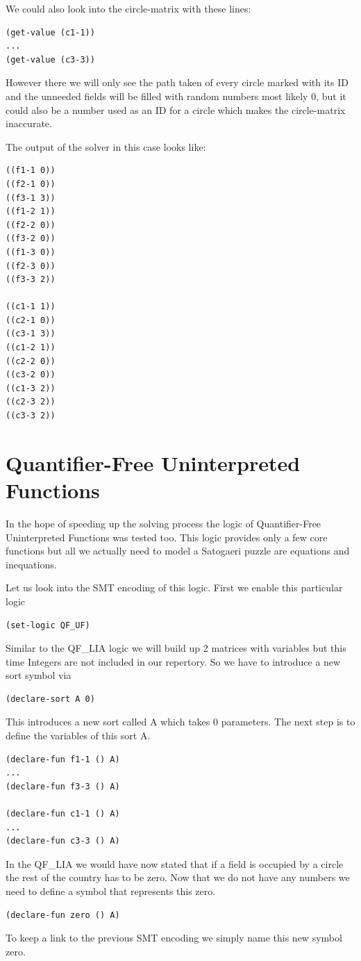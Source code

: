 We could also look into the circle-matrix with these lines:
\begin{lstlisting}
(get-value (c1-1))
...
(get-value (c3-3))
\end{lstlisting}
However there we will only see the path taken of every circle marked with its ID and the unneeded fields will be filled with random numbers most likely 0, but it could also be a number used as an ID for a circle which makes the circle-matrix inaccurate.

The output of the solver in this case looks like:
\begin{lstlisting}
((f1-1 0))
((f2-1 0))
((f3-1 3))
((f1-2 1))
((f2-2 0))
((f3-2 0))
((f1-3 0))
((f2-3 0))
((f3-3 2))

((c1-1 1))
((c2-1 0))
((c3-1 3))
((c1-2 1))
((c2-2 0))
((c3-2 0))
((c1-3 2))
((c2-3 2))
((c3-3 2))
\end{lstlisting}

\section{Quantifier-Free Uninterpreted Functions}
In the hope of speeding up the solving process the logic of Quantifier-Free Uninterpreted Functions was tested too. This logic provides only a few core functions but all we actually need to model a Satogaeri puzzle are equations and inequations.

Let us look into the SMT encoding of this logic. First we enable this particular logic
\begin{lstlisting}
(set-logic QF_UF)
\end{lstlisting}
 
Similar to the QF\_LIA logic we will build up 2 matrices with variables but this time Integers are not included in our repertory. So we have to introduce a new sort symbol via
\begin{lstlisting}
(declare-sort A 0)
\end{lstlisting}
This introduces a new sort called A which takes 0 parameters. The next step is to define the variables of this sort A.
\begin{lstlisting}
(declare-fun f1-1 () A)
...
(declare-fun f3-3 () A)

(declare-fun c1-1 () A)
...
(declare-fun c3-3 () A)
\end{lstlisting}

In the QF\_LIA we would have now stated that if a field is occupied by a circle the rest of the country has to be zero. Now that we do not have any numbers we need to define a symbol that represents this zero.
\begin{lstlisting}
(declare-fun zero () A)
\end{lstlisting}
To keep a link to the previous SMT encoding we simply name this new symbol zero.

